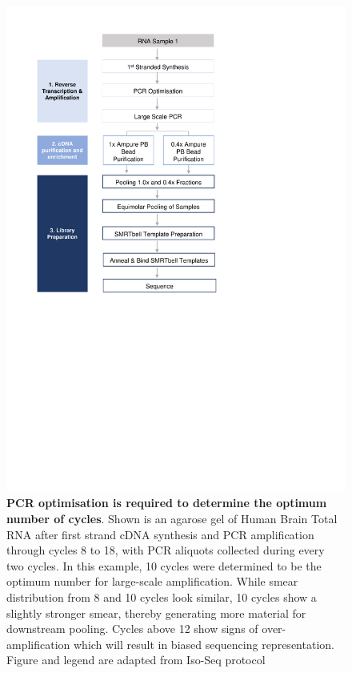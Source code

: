 \begin{figure}[htp]
	\begin{center}
		\includegraphics[page=13,trim={1cm 24cm 10cm 1cm},clip,scale = 0.9]{Figures/ProjectDevelopment_Figures.pdf}
	\end{center}
	\captionsetup{width=0.95\textwidth}
	\caption[Example of an agarose gel for determining the optimum number of PCR cycles for amplification]%
	{\textbf{PCR optimisation is required to determine the optimum number of cycles}. Shown is an agarose gel of Human Brain Total RNA after first strand cDNA synthesis and PCR amplification through cycles 8 to 18, with PCR aliquots collected during every two cycles. In this example, 10 cycles were determined to be the optimum number for large-scale amplification. While smear distribution from 8 and 10 cycles look similar, 10 cycles show a slightly stronger smear, thereby generating more material for downstream pooling. Cycles above 12 show signs of over-amplification which will result in biased sequencing representation. Figure and legend are adapted from Iso-Seq protocol}
	\label{fig:pcr_optimisation_gel_eg}
\end{figure}


